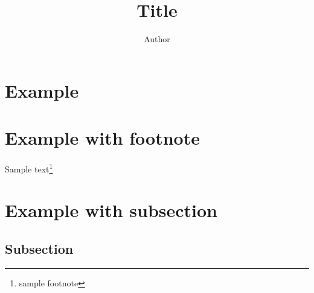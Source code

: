 \documentclass{article}
\title{Title}
\author{Author}
\date{}
\begin{document}
\maketitle

\section*{Example} %
\lipsum
\par \lipsum

\section*{Example with footnote}
Sample text\footnote{\tiny sample footnote}

\section*{Example with subsection}
\lipsum    
  \subsection*{Subsection}
    \lipsum
    
% 
\end{document}
